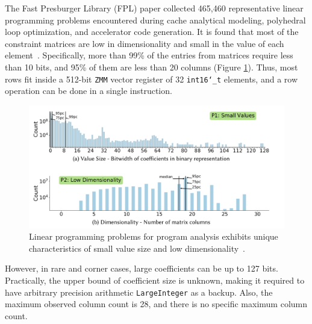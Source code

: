 \documentclass[logo,bsc,singlespacing,parskip]{infthesis}
\newcommand{\dtshort}{\texttt{int16\char`_t}}
\newcommand{\zmm}{\texttt{ZMM}}
\begin{document}
The Fast Presburger Library (FPL) paper collected 465,460 representative linear programming problems encountered during cache analytical modeling, polyhedral loop optimization, and accelerator code generation. It is found that most of the constraint matrices are low in dimensionality and small in the value of each element~\cite{FPL1}. Specifically, more than 99\% of the entries from matrices require less than 10 bits, and 95\% of them are less than 20 columns (Figure \ref{small-val-low-dim}). Thus, most rows fit inside a 512-bit \zmm{} vector register of 32 \dtshort{} elements, and a row operation can be done in a single instruction. 


\begin{figure}
    \begin{center}
    \includegraphics[width=\linewidth]{image/small-val-low-dim.png}
    \caption{Linear programming problems for program analysis exhibits unique
    characteristics of small value size and low dimensionality~\cite{FPL1}.}
    \label{small-val-low-dim}
    \end{center}
\end{figure}

However, in rare and corner cases, large coefficients can be up to 127 bits. Practically, the upper bound of coefficient size is unknown, making it required to have arbitrary precision arithmetic \texttt{LargeInteger} as a backup. Also, the maximum observed column count is 28, and there is no specific maximum column count. 
\end{document}
